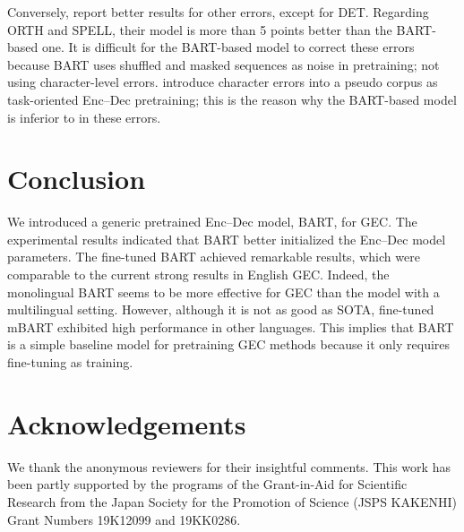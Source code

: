 \documentclass[11pt,a4paper]{article}
\begin{document}
Conversely, \citet{kaneko_bert} report better results for other errors, except for DET.
Regarding ORTH and SPELL, their model is more than 5  points better than the BART-based one.
It is difficult for the BART-based model to correct these errors because BART uses shuffled and masked sequences as noise in pretraining; not using character-level errors.
\citet{kaneko_bert} introduce character errors into a pseudo corpus as task-oriented Enc--Dec pretraining;
 this is the reason why the BART-based model is inferior to \citet{kaneko_bert} in these errors.

\section{Conclusion}
We introduced a generic pretrained Enc--Dec model, BART, for GEC.
The experimental results indicated that BART better initialized the Enc--Dec model parameters.
The fine-tuned BART achieved remarkable results, which were comparable to the current strong results in English GEC.
Indeed, the monolingual BART seems to be more effective for GEC than the model with a multilingual setting.
However, although it is not as good as SOTA, fine-tuned mBART exhibited high performance in other languages.
This implies that
 BART is a simple baseline model for pretraining GEC methods because it only requires fine-tuning as training.

\section*{Acknowledgements}
We thank the anonymous reviewers for their insightful comments.
This work has been partly supported by the programs of the
Grant-in-Aid for Scientific Research from the Japan Society for the
Promotion of Science (JSPS KAKENHI) Grant Numbers 19K12099 and
19KK0286.



\end{document}

